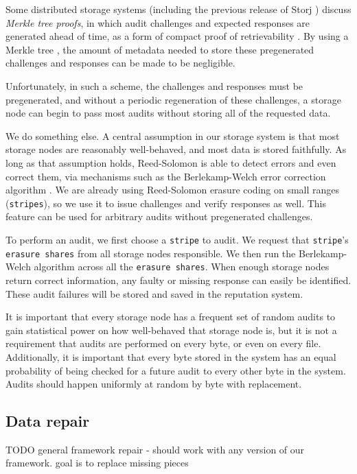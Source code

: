 \documentclass[a4paper,10pt]{article} \usepackage[utf8]{inputenc}
\newcommand{\x}[1]{{\tt #1}} \newcommand{\code}[1]{{\tt #1}}
\newcommand{\todo}[1]{{\color{red} TODO #1 }}
\begin{document}
Some distributed storage systems (including the previous release of Storj
\cite{storj-v2}) discuss {\em Merkle tree proofs}, in which audit challenges
and expected responses are generated ahead of time, as a form of compact
proof of retrievability \cite{proof-of-retrievability}. By using a Merkle tree
\cite{merkle-tree}, the amount of metadata needed to store these pregenerated
challenges and responses can be made to be negligible.

Unfortunately, in such a scheme, the challenges and responses must be
pregenerated, and without a periodic regeneration of these challenges, a
storage node can begin to pass most audits without storing all of the requested
data.

We do something else.
A central assumption in our storage system is that most storage nodes are
reasonably well-behaved, and most data is stored faithfully. As long as that
assumption holds, Reed-Solomon is able to detect errors and even correct them,
via mechanisms such as the Berlekamp-Welch error correction algorithm \cite{bw}.
We are already using Reed-Solomon erasure coding
\cite{rs} on small ranges (\x{stripes}), so we use it to issue challenges and
verify responses as well.
This feature can be used for arbitrary audits without pregenerated challenges.

To perform an audit, we first choose a \x{stripe} to audit. We request that
\x{stripe}'s \x{erasure shares} from all storage nodes responsible. We then run
the Berlekamp-Welch algorithm \cite{bw} across all the \x{erasure shares}. When
enough storage nodes return correct information, any faulty or missing response
can easily be identified. These audit failures will be stored and saved in the
reputation system.

It is important that every storage node has a frequent set of random audits to
gain statistical power on how well-behaved that storage node is, but it is not
a requirement that audits are performed on every byte, or even on every file.
Additionally, it is important that every byte stored in the system has an equal
probability of being checked for a future audit to every other byte in the
system. Audits should happen uniformly at random by byte with replacement.

\subsection{Data repair}\label{sec:data_repair}

\todo{general framework repair - should work with any version of our framework.
goal is to replace missing pieces}
\end{document}
